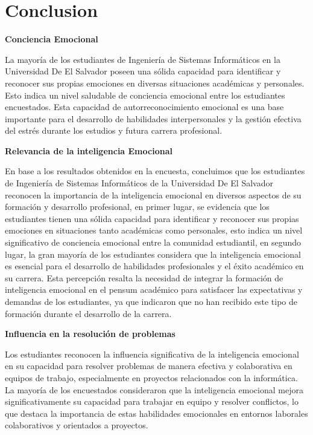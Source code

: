 \documentclass[journal]{IEEEtran}
\begin{document}
\newpage

\section{Conclusion}
\begin{center}
	\textbf{Conciencia Emocional}
\end{center}
La mayoría de los estudiantes de Ingeniería de Sistemas Informáticos en la Universidad De El Salvador poseen una sólida capacidad para identificar y reconocer sus propias emociones en diversas situaciones académicas y personales. Esto indica un nivel saludable de conciencia emocional entre los estudiantes encuestados. Esta capacidad de autorreconocimiento emocional es una base importante para el desarrollo de habilidades interpersonales y la gestión efectiva del estrés durante los estudios y futura carrera profesional.
\begin{center}
	\textbf{Relevancia de la inteligencia Emocional}
\end{center}
En base a los resultados obtenidos en la encuesta, concluimos que los estudiantes de Ingeniería de Sistemas Informáticos de la Universidad De El Salvador reconocen la importancia de la inteligencia emocional en diversos aspectos de su formación y desarrollo profesional, en primer lugar, se evidencia que los estudiantes tienen una sólida capacidad para identificar y reconocer sus propias emociones en situaciones tanto académicas como personales, esto indica un nivel significativo de conciencia emocional entre la comunidad estudiantil, en segundo lugar, la gran mayoría de los estudiantes considera que la inteligencia emocional es esencial para el desarrollo de habilidades profesionales y el éxito académico en su carrera. Esta percepción resalta la necesidad de integrar la formación de inteligencia emocional en el pensum académico para satisfacer las expectativas y demandas de los estudiantes, ya que indicaron que no han recibido este tipo de formación durante el desarrollo de la carrera.
\begin{center}
	\textbf{Influencia en la resolución de problemas}
\end{center}
Los estudiantes reconocen la influencia significativa de la inteligencia emocional en su capacidad para resolver problemas de manera efectiva y colaborativa en equipos de trabajo, especialmente en proyectos relacionados con la informática. La mayoría de los encuestados consideraron que la inteligencia emocional mejora significativamente su capacidad para trabajar en equipo y resolver conflictos, lo que destaca la importancia de estas habilidades emocionales en entornos laborales colaborativos y orientados a proyectos.
\end{document}

